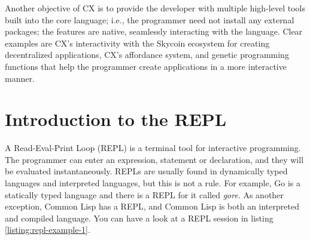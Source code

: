 \documentclass[11pt,fleqn,openany]{book} %
\begin{document}
Another objective of CX is to provide the developer with multiple high-level tools built into the core language; i.e., the programmer need not install any external packages; the features are native, seamlessly interacting with the language. Clear examples are CX's interactivity with the Skycoin ecosystem for creating decentralized applications, CX's affordance system, and genetic programming functions that help the programmer create applications in a more interactive manner.

\section{Introduction to the REPL}
\label{section:introduction-to-the-repl}


A Read-Eval-Print Loop (REPL) is a terminal tool for interactive programming. The programmer can enter an expression, statement or declaration, and they will be evaluated instantaneously. REPLs are usually found in dynamically typed languages and interpreted languages, but this is not a rule. For example, Go is a statically typed language and there is a REPL for it called \emph{gore}. As another exception, Common Lisp has a REPL, and Common Lisp is both an interpreted and compiled language. You can have a look at a REPL session in listing \ref{listing:repl-example-1}.
\end{document}
